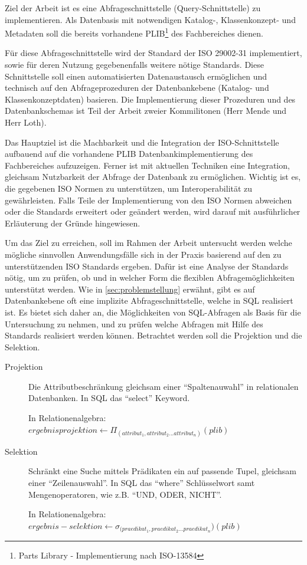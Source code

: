 Ziel der Arbeit ist es eine Abfrageschnittstelle (Query-Schnittstelle) zu implementieren. Als Datenbasis mit notwendigen Katalog-, Klassenkonzept- und Metadaten soll die bereits vorhandene PLIB\footnote{Parts Library - Implementierung nach ISO-13584} des Fachbereiches dienen. 

Für diese Abfrageschnittstelle wird der Standard der ISO 29002-31 implementiert, sowie für deren Nutzung gegebenenfalls weitere nötige Standards. Diese Schnittstelle soll einen automatisierten Datenaustausch ermöglichen und technisch auf den Abfrageprozeduren der Datenbankebene (Katalog- und Klassenkonzeptdaten) basieren. Die Implementierung dieser Prozeduren und des Datenbankschemas ist Teil der Arbeit zweier Kommilitonen (Herr Mende und Herr Loth).
 
Das Hauptziel ist die Machbarkeit und die Integration der ISO-Schnittstelle aufbauend auf die vorhandene PLIB Datenbankimplementierung des Fachbereiches aufzuzeigen. 
Ferner ist mit aktuellen Techniken eine Integration, gleichsam Nutzbarkeit der Abfrage der Datenbank zu ermöglichen. Wichtig ist es, die gegebenen ISO Normen zu unterstützen, um Interoperabilität zu gewährleisten. Falls Teile der Implementierung von den ISO Normen abweichen oder die Standards erweitert oder geändert werden, wird darauf mit ausführlicher Erläuterung der Gründe hingewiesen. 

Um das Ziel zu erreichen, soll im Rahmen der Arbeit untersucht werden welche mögliche sinnvollen Anwendungsfälle sich in der Praxis basierend auf den zu unterstützenden ISO Standards ergeben. Dafür ist eine Analyse der Standards nötig, um zu prüfen, ob und in welcher Form die flexiblen Abfragemöglichkeiten unterstützt werden. Wie in \autoref{sec:problemstellung} erwähnt, gibt es auf Datenbankebene oft eine implizite Abfrageschnittstelle, welche in SQL realisiert ist. Es bietet sich daher an, die Möglichkeiten von SQL-Abfragen als Basis für die Untersuchung zu nehmen, und zu prüfen welche Abfragen mit Hilfe des Standards realisiert werden können. 
Betrachtet werden soll die Projektion und die Selektion.

\begin{description}
\item[Projektion] Die Attributbeschränkung gleichsam einer \enquote{Spaltenauwahl} in relationalen Datenbanken. In SQL das \enquote{select} Keyword.   

In Relationenalgebra:
$ergebnisprojektion \leftarrow  \Pi_{(attribut_1, attribut_2... attribut_n)}(plib)$ \\

\item[Selektion] Schränkt eine Suche mittels Prädikaten ein auf passende Tupel, gleichsam einer \enquote{Zeilenauswahl}. In SQL das \enquote{where} Schlüsselwort samt Mengenoperatoren, wie z.B. \enquote{UND, ODER, NICHT}.

In Relationenalgebra:
$ergebnis-selektion \leftarrow  \sigma_{(praedikat_1, praedikat_2... praedikat_n})(plib)$ \\

\end{description}

